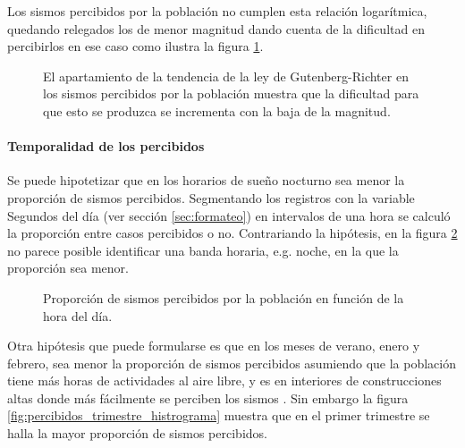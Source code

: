 \documentclass[a4paper]{report}
\begin{document}
Los sismos percibidos por la población no cumplen esta relación logarítmica, quedando relegados los de menor magnitud dando cuenta de la dificultad en percibirlos en ese caso como ilustra la figura \ref{fig:acumulado_anual_magnitud_percibidos}.
\begin{figure}[!ht]
\centering

\vspace{-0.8cm}
\caption{El apartamiento de la tendencia de la ley de Gutenberg-Richter en los sismos percibidos por la población muestra que la dificultad para que esto se produzca se incrementa con la baja de la magnitud.}
\label{fig:acumulado_anual_magnitud_percibidos}
\end{figure}



\paragraph{Temporalidad de los percibidos}
Se puede hipotetizar que en los horarios de sueño nocturno sea menor la proporción de sismos percibidos.
Segmentando los registros con la variable Segundos del día (ver sección \ref{sec:formateo}) en intervalos de una hora se calculó la proporción entre casos percibidos o no.
Contrariando la hipótesis, en la figura \ref{fig:histograma_percibidos_por_hora} no parece posible identificar una banda horaria, e.g. noche, en la que la proporción sea menor.

\begin{figure}[!ht]
\centering

\vspace{-0.8cm}
\caption{Proporción de sismos percibidos por la población en función de la hora del día.}
\label{fig:histograma_percibidos_por_hora}
\end{figure}

Otra hipótesis que puede formularse es que en los meses de verano, enero y febrero, sea menor la proporción de sismos percibidos asumiendo que la población tiene más horas de actividades al aire libre, y es en interiores de construcciones altas donde más fácilmente se perciben los sismos \cite{noauthor_intensidad_2022}.
Sin embargo la figura \ref{fig:percibidos_trimestre_histrograma} muestra que en el primer trimestre se halla la mayor proporción de sismos percibidos.
\end{document}
